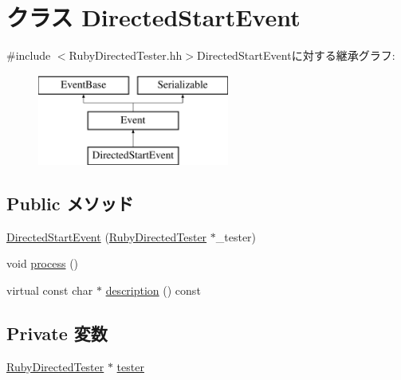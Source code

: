 \hypertarget{classRubyDirectedTester_1_1DirectedStartEvent}{
\section{クラス DirectedStartEvent}
\label{classRubyDirectedTester_1_1DirectedStartEvent}
}


{\ttfamily \#include $<$RubyDirectedTester.hh$>$}DirectedStartEventに対する継承グラフ:\begin{figure}[H]
\begin{center}
\leavevmode
\includegraphics[height=3cm]{classRubyDirectedTester_1_1DirectedStartEvent}
\end{center}
\end{figure}
\subsection*{Public メソッド}
\begin{DoxyCompactItemize}
\item 
\hyperlink{classRubyDirectedTester_1_1DirectedStartEvent_af78c64e46cf00d0b6639e08d8db18183}{DirectedStartEvent} (\hyperlink{classRubyDirectedTester_1_1RubyDirectedTester}{RubyDirectedTester} $\ast$\_\-tester)
\item 
void \hyperlink{classRubyDirectedTester_1_1DirectedStartEvent_a2e9c5136d19b1a95fc427e0852deab5c}{process} ()
\item 
virtual const char $\ast$ \hyperlink{classRubyDirectedTester_1_1DirectedStartEvent_a130ddddf003422b413e2e891b1b80e8f}{description} () const 
\end{DoxyCompactItemize}
\subsection*{Private 変数}
\begin{DoxyCompactItemize}
\item 
\hyperlink{classRubyDirectedTester_1_1RubyDirectedTester}{RubyDirectedTester} $\ast$ \hyperlink{classRubyDirectedTester_1_1DirectedStartEvent_acb5296901e83f3dd66a2fdaab4fbc259}{tester}
\end{DoxyCompactItemize}


